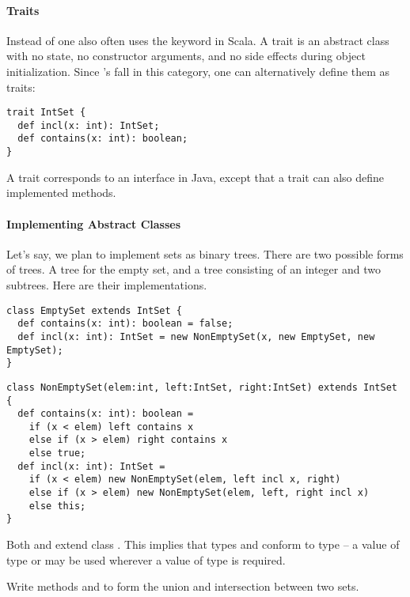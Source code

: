 \paragraph{Traits}

Instead of  one also often uses the keyword
 in Scala. A trait is an abstract class with no state, no
constructor arguments, and no side effects during object
initialization.  Since 's fall in this category, one can
alternatively define them as traits:
\begin{lstlisting}
trait IntSet {
  def incl(x: int): IntSet;
  def contains(x: int): boolean;
}
\end{lstlisting}
A trait corresponds to an interface in Java, except
that a trait can also define implemented methods.  

\paragraph{Implementing Abstract Classes}

Let's say, we plan to implement sets as binary trees.  There are two
possible forms of trees. A tree for the empty set, and a tree
consisting of an integer and two subtrees. Here are their
implementations.

\begin{lstlisting}
class EmptySet extends IntSet {
  def contains(x: int): boolean = false;
  def incl(x: int): IntSet = new NonEmptySet(x, new EmptySet, new EmptySet);
}
\end{lstlisting}

\begin{lstlisting}
class NonEmptySet(elem:int, left:IntSet, right:IntSet) extends IntSet {
  def contains(x: int): boolean = 
    if (x < elem) left contains x
    else if (x > elem) right contains x
    else true;
  def incl(x: int): IntSet = 
    if (x < elem) new NonEmptySet(elem, left incl x, right)
    else if (x > elem) new NonEmptySet(elem, left, right incl x)
    else this;
}
\end{lstlisting}
Both  and  extend class
.  This implies that types  and
 conform to type  -- a value of type  or  may be used wherever a value of type  is required.

\begin{exercise} Write methods  and  to form
the union and intersection between two sets.
\end{exercise}

